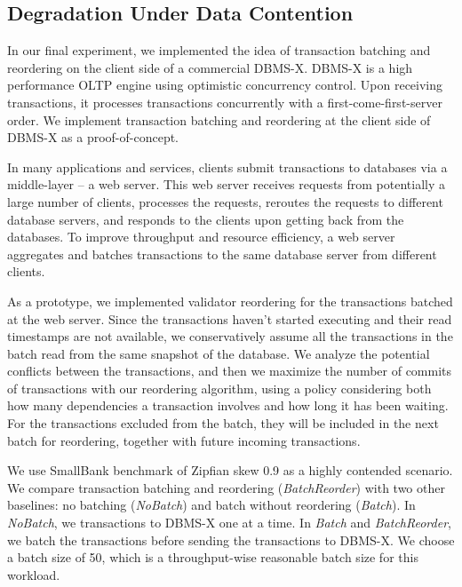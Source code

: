 \subsection{Degradation Under Data Contention}
\label{subsec:experiment:compare}

In our final experiment, we implemented the idea of transaction batching and reordering on the client side of a commercial DBMS-X. DBMS-X is a high performance OLTP engine using optimistic concurrency control. Upon receiving transactions, it processes transactions concurrently with a first-come-first-server order. We implement transaction batching and reordering at the client side of DBMS-X as a proof-of-concept.

In many applications and services, clients submit transactions to databases via a middle-layer -- a web server. This web server receives requests from potentially a large number of clients, processes the requests, reroutes the requests to different database servers, and responds to the clients upon getting back from the databases. To improve throughput and resource efficiency, a web server aggregates and batches transactions to the same database server from different clients. 

As a prototype, we implemented validator reordering for the transactions batched at the web server. Since the transactions haven't started executing and their read timestamps are not available, we conservatively assume all the transactions in the batch read from the same snapshot of the database. We analyze the potential conflicts between the transactions, and then we maximize the number of commits of transactions with our reordering algorithm, using a policy considering both how many dependencies a transaction involves and how long it has been waiting. For the transactions excluded from the batch, they will be included in the next batch for reordering, together with future incoming transactions.

We use SmallBank benchmark of Zipfian skew 0.9 as a highly contended scenario. We compare transaction batching and reordering (\emph{BatchReorder}) with two other baselines: no batching (\emph{NoBatch}) and batch without reordering (\emph{Batch}). In \emph{NoBatch}, we transactions to DBMS-X one at a time. In \emph{Batch} and \emph{BatchReorder}, we batch the transactions before sending the transactions to DBMS-X. We choose a batch size of 50, which is a throughput-wise reasonable batch size for this workload.


